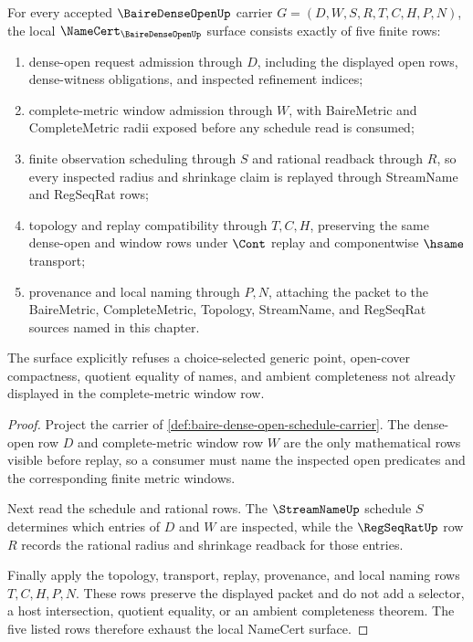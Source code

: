 \begin{theorem}
\label{thm:baire-dense-open-schedule-obligation-surface}
For every accepted $\BaireDenseOpenUp$ carrier $G=(D,W,S,R,T,C,H,P,N)$, the local $\NameCert_{\BaireDenseOpenUp}$ surface consists exactly of five finite rows:
\begin{enumerate}
\item dense-open request admission through $D$, including the displayed open rows, dense-witness obligations, and inspected refinement indices;
\item complete-metric window admission through $W$, with BaireMetric and CompleteMetric radii exposed before any schedule read is consumed;
\item finite observation scheduling through $S$ and rational readback through $R$, so every inspected radius and shrinkage claim is replayed through StreamName and RegSeqRat rows;
\item topology and replay compatibility through $T,C,H$, preserving the same dense-open and window rows under $\Cont$ replay and componentwise $\hsame$ transport;
\item provenance and local naming through $P,N$, attaching the packet to the BaireMetric, CompleteMetric, Topology, StreamName, and RegSeqRat sources named in this chapter.
\end{enumerate}
The surface explicitly refuses a choice-selected generic point, open-cover compactness, quotient equality of names, and ambient completeness not already displayed in the complete-metric window row.
\end{theorem}
\begin{proof}
Project the carrier of \autoref{def:baire-dense-open-schedule-carrier}. The dense-open row $D$ and complete-metric window row $W$ are the only mathematical rows visible before replay, so a consumer must name the inspected open predicates and the corresponding finite metric windows.

Next read the schedule and rational rows. The $\StreamNameUp$ schedule $S$ determines which entries of $D$ and $W$ are inspected, while the $\RegSeqRatUp$ row $R$ records the rational radius and shrinkage readback for those entries.

Finally apply the topology, transport, replay, provenance, and local naming rows $T,C,H,P,N$. These rows preserve the displayed packet and do not add a selector, a host intersection, quotient equality, or an ambient completeness theorem. The five listed rows therefore exhaust the local NameCert surface.
\end{proof}

